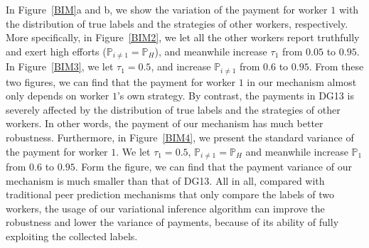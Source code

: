 In Figure~\ref{BIM}a and b, we show the variation of the payment for worker $1$ with the distribution of true labels and the strategies of other workers, respectively.
More specifically, in Figure~\ref{BIM2}, we let all the other workers report truthfully and exert high efforts ($\mathbb{P}_{i\neq 1}=\mathbb{P}_H$), and meanwhile increase $\tau_1$ from $0.05$ to $0.95$.
In Figure~\ref{BIM3}, we let $\tau_1=0.5$, and increase $\mathbb{P}_{i\neq 1}$ from $0.6$ to $0.95$.
From these two figures, we can find that the payment for worker $1$ in our mechanism almost only depends on worker $1$'s own strategy.
By contrast, the payments in DG13 is severely affected by the distribution of true labels and the strategies of other workers.
In other words, the payment of our mechanism has much better robustness.
Furthermore, in Figure~\ref{BIM4}, we present the standard variance of the payment for worker $1$.
We let $\tau_1=0.5$, $\mathbb{P}_{i\neq 1}=\mathbb{P}_H$ and meanwhile increase $\mathbb{P}_1$ from $0.6$ to $0.95$.
Form the figure, we can find that the payment variance of our mechanism is much smaller than that of DG13.
All in all, compared with traditional peer prediction mechanisms that only compare the labels of two workers, the usage of our variational inference algorithm can improve the robustness and lower the variance of payments, because of its ability of fully exploiting the collected labels.



